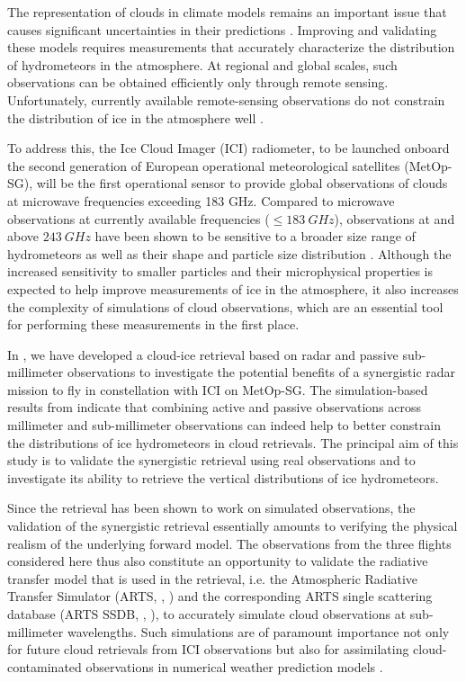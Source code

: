 \documentclass[journal abbreviation, manuscript]{copernicus}
\begin{document}
\introduction  %

The representation of clouds in climate models remains an important issue that
causes significant uncertainties in their predictions \citep{zelinka20}.
Improving and validating these models requires measurements that accurately
characterize the distribution of hydrometeors in the atmosphere. At regional and
global scales, such observations can be obtained efficiently only through remote
sensing. Unfortunately, currently available remote-sensing observations do not
constrain the distribution of ice in the atmosphere well \citep{waliser09,
  eliasson11, duncan18a}.

To address this, the Ice Cloud Imager (ICI) radiometer, to be launched onboard
the second generation of European operational meteorological satellites
(MetOp-SG), will be the first operational sensor to provide global observations
of clouds at microwave frequencies exceeding 183 GHz. Compared to microwave
observations at currently available frequencies ($\leq 183\ \unit{GHz}$),
observations at and above $243\ \unit{GHz}$ have been shown to be sensitive to a
broader size range of hydrometeors \citep{buehler12} as well as their shape and
particle size distribution \citep{evans98}. Although the increased sensitivity
to smaller particles and their microphysical properties is expected to help
improve measurements of ice in the atmosphere, it also increases the complexity
of simulations of cloud observations, which are an essential tool for performing
these measurements in the first place.

In \citet{pfreundschuh20}, we have developed a cloud-ice retrieval based on
radar and passive sub-millimeter observations to investigate the potential
benefits of a synergistic radar mission to fly in constellation with ICI on
MetOp-SG. The simulation-based results from \citet{pfreundschuh20} indicate that
combining active and passive observations across millimeter and sub-millimeter
observations can indeed help to better constrain the distributions of ice
hydrometeors in cloud retrievals. The principal aim of this study is to validate
the synergistic retrieval using real observations and to investigate its ability
to retrieve the vertical distributions of ice hydrometeors.

Since the retrieval has been shown to work on simulated observations, the
validation of the synergistic retrieval essentially amounts to verifying the
physical realism of the underlying forward model. The observations from the
three flights considered here thus also constitute an opportunity to validate
the radiative transfer model that is used in the retrieval, i.e. the Atmospheric
Radiative Transfer Simulator (ARTS, \citeauthor{arts18}, \citeyear{arts18}) and
the corresponding ARTS single scattering database (ARTS SSDB,
\citeauthor{eriksson18}, \citeyear{eriksson18}), to accurately simulate cloud
observations at sub-millimeter wavelengths. Such simulations are of paramount
importance not only for future cloud retrievals from ICI observations
\citep{eriksson20} but also for assimilating cloud-contaminated observations in
numerical weather prediction models \citep{geer17}.
\end{document}
